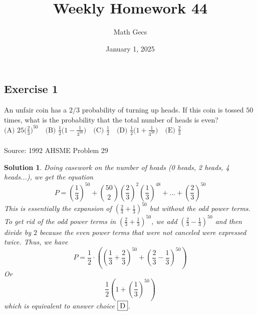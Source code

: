 \documentclass[12pt]{article}
\title{Weekly Homework 44}
\author{Math Gecs}
\date{January 1, 2025}
\newtheorem*{solution*}{Solution}
\begin{document}
\maketitle

\subsection*{Exercise 1}
An unfair coin has a $2/3$ probability of turning up heads. If this coin is tossed $50$ times, what is the probability that the total number of heads is even?\\
$\text{(A) } 25\bigg(\frac{2}{3}\bigg)^{50}\quad \text{(B) } \frac{1}{2}\bigg(1-\frac{1}{3^{50}}\bigg)\quad \text{(C) } \frac{1}{2}\quad \text{(D) } \frac{1}{2}\bigg(1+\frac{1}{3^{50}}\bigg)\quad \text{(E) } \frac{2}{3}$ \\ \\
Source: 1992 AHSME Problem 29\\


\begin{solution*}
Doing casework on the number of heads (0 heads, 2 heads, 4 heads...), we get the equation\[P=\left(\frac{1}{3} \right)^{50}+\binom{50}{2}\left(\frac{2}{3} \right)^{2}\left(\frac{1}{3} \right)^{48}+\dots+\left(\frac{2}{3} \right)^{50}\]This is essentially the expansion of $\left(\frac{2}{3}+\frac{1}{3} \right)^{50}$ but without the odd power terms. To get rid of the odd power terms in $\left(\frac{2}{3}+\frac{1}{3} \right)^{50}$, we add $\left(\frac{2}{3}-\frac{1}{3} \right)^{50}$ and then divide by $2$ because the even power terms that were not canceled were expressed twice. Thus, we have\[P=\frac{1}{2}\cdot\left(\left(\frac{1}{3}+\frac{2}{3} \right)^{50}+\left(\frac{2}{3}-\frac{1}{3} \right)^{50} \right)\]Or\[\frac{1}{2}\left(1+\left(\frac{1}{3} \right)^{50} \right)\]which is equivalent to answer choice $\fbox{D}$.
\end{solution*}
\end{document}
